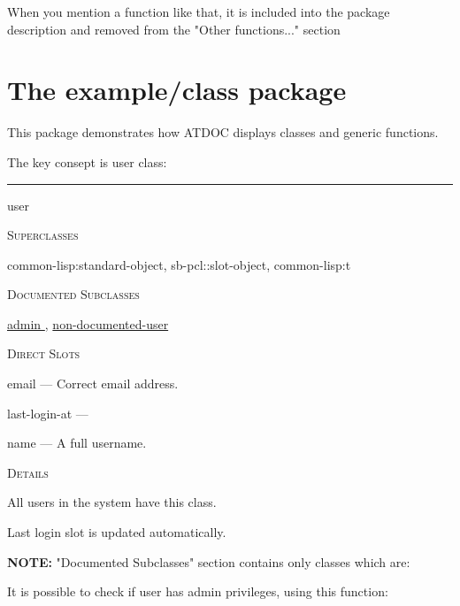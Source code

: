 \documentclass[a4paper]{report}
\begin{document}
  


                   When you mention a function like that, it is included into
                   the package description and removed from the                   "Other functions..." section
    \chapter{The example/class package}
    This package demonstrates how ATDOC displays classes and generic functions.


                   The key consept is user class:

                   

    \rule{\linewidth}{0.1mm}
    
    \label{example/class__class__user}
    \begin{defun}[Class]
    user


      
    \bigskip
    \textsc{Superclasses}

\color[rgb]{0.5,0.5,0.5}common-lisp:standard-object\color[rgb]{0,0,0}, \color[rgb]{0.5,0.5,0.5}sb-pcl::slot-object\color[rgb]{0,0,0}, \color[rgb]{0.5,0.5,0.5}common-lisp:t\color[rgb]{0,0,0}


      
    \bigskip
    \textsc{Documented Subclasses}

\hyperref[example/class__class__admin]{
	  admin
	}
      , \hyperref[example/class__class__non-documented-user]{
	  non-documented-user
	}
      


	
    \bigskip
    \textsc{Direct Slots}

email --- Correct email address.

last-login-at --- 

name --- A full username.




	
    \bigskip
    \textsc{Details}

All users in the system have this class.


Last login slot is updated automatically.

\textbf{NOTE:} "Documented Subclasses" section contains only classes which are:


    
    \end{defun}
  
  


                   It is possible to check if user has admin privileges, using this function:
\end{document}
